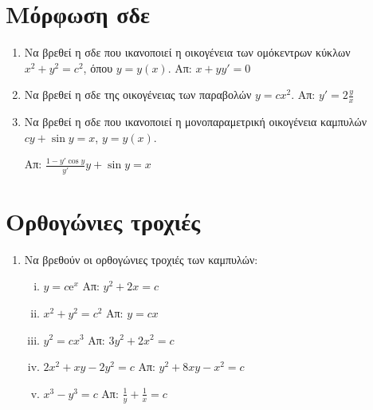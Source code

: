


\pagestyle{askhseis}





\begin{center}
\end{center}

\vspace{\baselineskip}


\section*{Μόρφωση σδε}

\begin{enumerate}
  \item Να βρεθεί η σδε που ικανοποιεί η οικογένεια των ομόκεντρων κύκλων 
    $ x^{2} + y^{2} = c^{2} $,  όπου  $ y=y(x) $.
    \hfill Απ: $ x+yy'=0 $ 

  \item Να βρεθεί η σδε της οικογένειας των παραβολών $ y=cx^{2} $.
    \hfill Απ: $ y'=2 \frac{y}{x} $ 

  \item  Να βρεθεί η σδε που ικανοποιεί η μονοπαραμετρική οικογένεια καμπυλών   
   $ cy+ \sin{y} = x $, $ y=y(x) $.

    \hfill Απ: $ \frac{1-y' \cos{y}}{y'} y + \sin{y} = x $ 
\end{enumerate}

\section*{Ορθογώνιες τροχιές}

\begin{enumerate}
  \item Να βρεθούν οι ορθογώνιες τροχιές των καμπυλών:

    \begin{enumerate}[i)]
      \item $ y=c \mathrm{e}^{x} $ \hfill Απ: $ y^{2}+2x=c $ %
      \item $ x^{2}+y^{2}=c^{2} $ \hfill Απ: $ y=cx $  %
      \item $ y^{2}=cx^{3} $ \hfill Απ: $ 3y^{2}+2x^{2}=c $ 
      \item $ 2x^{2}+xy-2y^{2}=c $ \hfill Απ: $ y^{2}+8xy-x^{2}=c $ 
      \item $ x^{3}-y^{3}=c $ \hfill Απ: $ \frac{1}{y} + \frac{1}{x} =c $ 
    \end{enumerate}
\end{enumerate}



